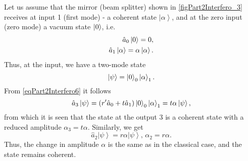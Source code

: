 

Let us assume that the mirror (beam splitter) shown in
\autoref{figPart2Interfero_3} receives at input 1 (first mode) -
a coherent state $\left|\alpha\right>$, and at the zero input
(zero mode) a vacuum state $\ket{0}$, i.e.
\begin{eqnarray}
\hat{a}_0 \ket{0} = 0,
\nonumber \\
\hat{a}_1 \left|\alpha\right> = \alpha \left|\alpha\right>.
\nonumber
\end{eqnarray}
Thus, at the input, we have a two-mode state 
\[
\left|\psi\right> = \ket{0}_0 \left|\alpha\right>_1.
\]
From \eqref{eqPart2Interfero6} it follows
\begin{equation}
\hat{a}_3\left|\psi\right> = 
\left(r' \hat{a}_0 + t \hat{a}_1\right)\ket{0}_0
\left|\alpha\right>_1 = 
t \alpha \left|\psi\right>,
\nonumber
\end{equation}
from which it is seen that the state at the output 3 is a coherent state
with a reduced amplitude $\alpha_3 = t \alpha$. 
Similarly, we get
\begin{equation}
\hat{a}_2\left|\psi\right> = 
r \alpha \left|\psi\right>, \, \alpha_2 = r\alpha.
\label{eqPart2InterferoTask3}
\end{equation}
Thus, the change in amplitude $\alpha$ is the same as in
the classical case, and the state remains coherent.

